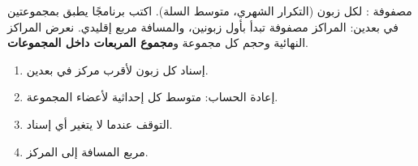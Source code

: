 \begin{statement}
مصفوفة : لكل زبون (التكرار الشهري، متوسط السلة). اكتب برنامجًا يطبق \textbf{} بمجموعتين في بعدين: المراكز مصفوفة  تبدأ بأول زبونين، والمسافة مربع إقليدي. نعرض المراكز النهائية وحجم كل مجموعة و\textbf{مجموع المربعات داخل المجموعات}.
\end{statement}
\begin{stepsbox}\begin{enumerate}
\item إسناد كل زبون لأقرب مركز في بعدين.
\item إعادة الحساب: متوسط كل إحداثية لأعضاء المجموعة.
\item التوقف عندما لا يتغير أي إسناد.
\item {} مربع المسافة إلى المركز.
\end{enumerate}\end{stepsbox}
